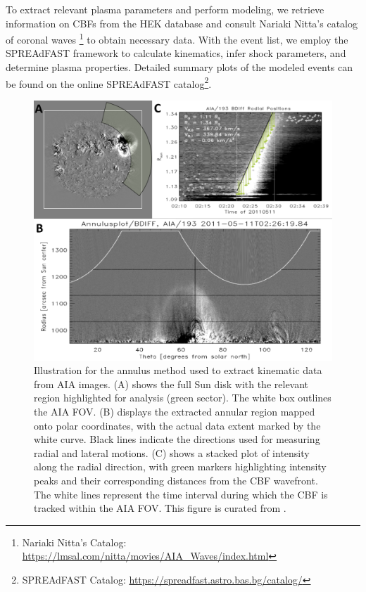 To extract relevant plasma parameters and perform modeling, we retrieve information on CBFs from the HEK database and consult Nariaki Nitta's catalog of coronal waves  \citep{nitta_2013}\footnote{Nariaki Nitta's Catalog: \url{https://lmsal.com/nitta/movies/AIA_Waves/index.html}} to obtain necessary data. With the event list, we employ the SPREAdFAST framework to calculate kinematics, infer shock parameters, and determine plasma properties. Detailed summary plots of the modeled events can be found on the online SPREAdFAST catalog\footnote{SPREAdFAST Catalog: \url{https://spreadfast.astro.bas.bg/catalog/}}.

\begin{figure}[!htp] %
	\centerline{\includegraphics[width=0.9\columnwidth]{chapter2/figs/fig_annplot.pdf}}
	\caption{Illustration for the annulus method used to extract kinematic data from AIA images. (A) shows the full Sun disk with the relevant region highlighted for analysis (green sector). The white box outlines the AIA FOV. (B) displays the extracted annular region mapped onto polar coordinates, with the actual data extent marked by the white curve. Black lines indicate the directions used for measuring radial and lateral motions. (C) shows a stacked plot of intensity along the radial direction, with green markers highlighting intensity peaks and their corresponding distances from the CBF wavefront. The white lines represent the time interval during which the CBF is tracked within the AIA FOV. This figure is curated from \citep{kozarev_2017}.}
	\label{fig_annplot}
\end{figure}

